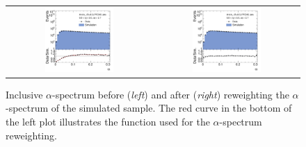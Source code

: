 \begin{description}
 \begin{figure}[!tp]
  \centering
  \begin{tabular}{cc}
                \includegraphics[width=0.49\textwidth]{figures/Alpha__AfterAsymmHistos.pdf} &
                \includegraphics[width=0.49\textwidth]{figures/AfterReweight_Alpha__AfterAsymmHistos.pdf}
  \end{tabular}
  \caption{Inclusive $\alpha$-spectrum before (\textit{left}) and after (\textit{right}) reweighting the $\alpha$-spectrum of the simulated sample. The red curve in the bottom of the left plot illustrates the function used for the $\alpha$-spectrum reweighting.}
  \label{fig:syst_uncert_alpha_spec}
\end{figure}
 

\end{description}
